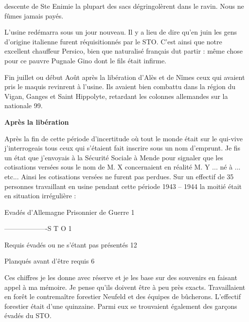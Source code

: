 
descente de Ste Enimie la plupart des sacs dégringolèrent dans le ravin. Nous ne fûmes jamais
payés.

L’usine redémarra sous un jour nouveau. Il y a lieu de dire qu’en juin les gens d’origine
italienne furent réquisitionnés par le STO. C’est ainsi que notre excellent chauffeur Persico,
bien que naturalisé français dut partir : même chose pour ce pauvre Pugnale Gino dont le fils
était infirme.

\vspace{0.45cm}

Fin juillet ou début Août après la libération d’Alès et de Nîmes ceux qui avaient pris le
maquis revinrent à l’usine. Ils avaient bien combattu dans la région du Vigan, Ganges et Saint
Hippolyte, retardant les colonnes allemandes sur la nationale 99.

\vspace{0.55cm}

\textbf{Après la libération}

\vspace{0.35cm}

Après la fin de cette période d’incertitude où tout le monde était sur le qui-vive j’interrogeais
tous ceux qui s’étaient fait inscrire sous un nom d’emprunt. Je fis un état que j’envoyais à la
Sécurité Sociale à Mende pour signaler que les cotisations versées sous le nom de M. X
concernaient en réalité M. Y ... né à ... etc... Ainsi les cotisations versées ne furent pas
perdues. Sur un effectif de 35 personnes travaillant en usine pendant cette période 1943 –
1944 la moitié était en situation irrégulière :

\vspace{0.25cm}

Evadés d’Allemagne Prisonnier de Guerre \hfill 1

-------------------S T O \hfill 1

Requis évadés ou ne s’étant pas présentés \hfill 12

Planqués avant d’être requis \hfill 6

\vspace{0.4cm}

Ces chiffres je les donne avec réserve et je les base sur des souvenirs en faisant appel à ma
mémoire. Je pense qu’ils doivent être à peu près exacts.
Travaillaient en forêt le contremaître forestier Neufeld et des équipes de bûcherons. L’effectif
forestier était d’une quinzaine. Parmi eux se trouvaient également des garçons évadés du
STO.

